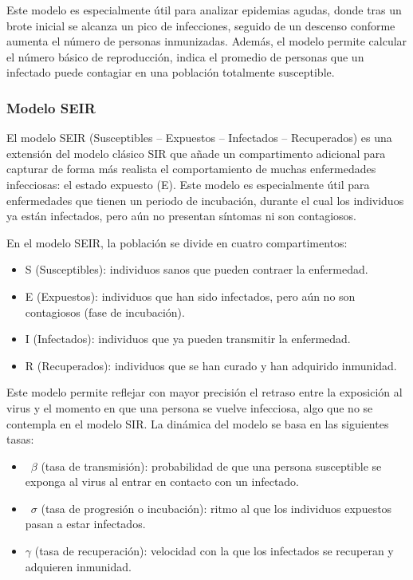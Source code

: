 Este modelo es especialmente útil para analizar epidemias agudas, donde tras un brote inicial se alcanza un pico de infecciones, seguido de un descenso conforme aumenta el número de personas inmunizadas. Además, el modelo permite calcular el número básico de reproducción, indica el promedio de personas que un infectado puede contagiar en una población totalmente susceptible.


\subsubsection*{Modelo SEIR}
El modelo SEIR (Susceptibles – Expuestos – Infectados – Recuperados) es una extensión del modelo clásico SIR que añade un compartimento adicional para capturar de forma más realista el comportamiento de muchas enfermedades infecciosas: el estado expuesto (E). Este modelo es especialmente útil para enfermedades que tienen un periodo de incubación, durante el cual los individuos ya están infectados, pero aún no presentan síntomas ni son contagiosos. 

En el modelo SEIR, la población se divide en cuatro compartimentos:
\begin{itemize}
    \item S (Susceptibles): individuos sanos que pueden contraer la enfermedad.
    \item E (Expuestos): individuos que han sido infectados, pero aún no son contagiosos (fase de incubación).
    \item I (Infectados): individuos que ya pueden transmitir la enfermedad.
    \item R (Recuperados): individuos que se han curado y han adquirido inmunidad.
\end{itemize}
	
Este modelo permite reflejar con mayor precisión el retraso entre la exposición al virus y el momento en que una persona se vuelve infecciosa, algo que no se contempla en el modelo SIR. La dinámica del modelo se basa en las siguientes tasas:
\begin{itemize}
    \item ~$\beta$ (tasa de transmisión): probabilidad de que una persona susceptible se exponga al virus al entrar en contacto con un infectado.
    \item ~$\sigma$ (tasa de progresión o incubación): ritmo al que los individuos expuestos pasan a estar infectados.
    \item $\gamma$ (tasa de recuperación): velocidad con la que los infectados se recuperan y adquieren inmunidad.
\end{itemize}

